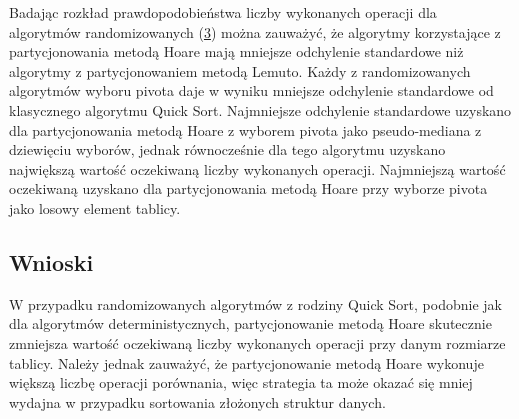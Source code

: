 Badając rozkład prawdopodobieństwa liczby wykonanych operacji dla algorytmów randomizowanych (\ref{fig:quick-sort-nondeterministic-pivot-density}) można zauważyć, że algorytmy korzystające z partycjonowania metodą Hoare mają mniejsze odchylenie standardowe niż algorytmy z partycjonowaniem metodą Lemuto. Każdy z randomizowanych algorytmów wyboru pivota daje w wyniku mniejsze odchylenie standardowe od klasycznego algorytmu Quick Sort. Najmniejsze odchylenie standardowe uzyskano dla partycjonowania metodą Hoare z wyborem pivota jako pseudo-mediana z dziewięciu wyborów, jednak równocześnie dla tego algorytmu uzyskano największą wartość oczekiwaną liczby wykonanych operacji. Najmniejszą wartość oczekiwaną uzyskano dla partycjonowania metodą Hoare przy wyborze pivota jako losowy element tablicy.

\begin{figure}[]
	\centering
	
	\caption[]{}
	\label{fig:quick-sort-nondeterministic-pivot-random}
\end{figure}

\begin{figure}[]
	\centering
	
	\caption[]{}
	\label{fig:quick-sort-nondeterministic-pivot-reversed}
\end{figure}

\begin{figure}[]
	\centering
	
	\caption[]{}
	\label{fig:quick-sort-nondeterministic-pivot-density}
\end{figure}

\begin{figure}[]
	\centering
	
	\caption[]{}
	\label{fig:quick-sort-nondeterministic-pivot-random-all}
\end{figure}

\subsection{Wnioski}
W przypadku randomizowanych algorytmów z rodziny Quick Sort, podobnie jak dla algorytmów deterministycznych, partycjonowanie metodą Hoare skutecznie zmniejsza wartość oczekiwaną liczby wykonanych operacji przy danym rozmiarze tablicy. Należy jednak zauważyć, że partycjonowanie metodą Hoare wykonuje większą liczbę operacji porównania, więc strategia ta może okazać się mniej wydajna w przypadku sortowania złożonych struktur danych.\\

